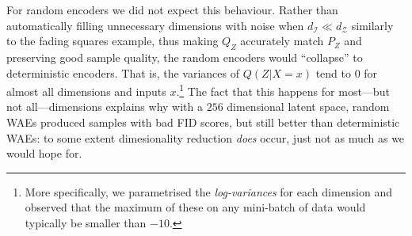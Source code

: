 \documentclass{article}
\def\dZ{d_{\mathcal{Z}}}
\def\dP{d_{\mathcal{I}}}
\begin{document}
For random encoders we did not expect this behaviour. Rather than automatically filling unnecessary dimensions with noise when $\dP\ll\dZ$ similarly to the fading squares example, thus making $Q_Z$ accurately match $P_Z$ and preserving good sample quality, the random encoders would ``collapse'' to deterministic encoders. That is, the variances of $Q(Z|X=x)$ tend to $0$ for almost all dimensions and inputs $x$.\footnote{More specifically, we parametrised the \emph{log-variances} for each dimension and observed that the maximum of these on any mini-batch of data would typically be smaller than $-10$.} The fact that this happens for most---but not all---dimensions explains why with a $256$ dimensional latent space, random WAEs produced samples with bad FID scores, but still better than deterministic WAEs: to some extent dimesionality reduction \emph{does} occur, just not as much as we would hope for.
\end{document}

